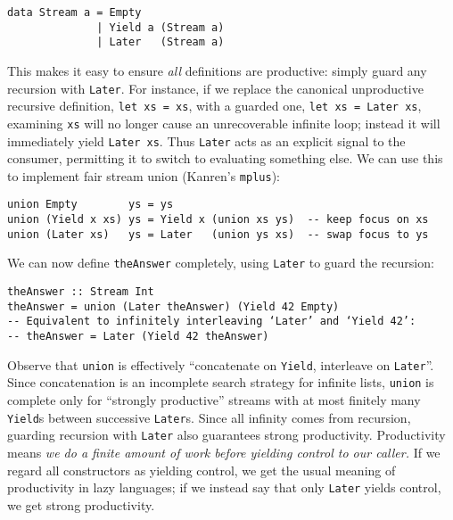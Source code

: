 \documentclass[acmsmall,screen,review,anonymous,dvipsnames,svgnames]{acmart}
\newcommand\hask[1]{\texttt{#1}}
\newcommand\ttt\texttt
\begin{document}

\begin{verbatim}
data Stream a = Empty
              | Yield a (Stream a)
              | Later   (Stream a)
\end{verbatim}

\noindent
This makes it easy to ensure \emph{all} definitions are productive: simply guard any recursion with \hask{Later}.\footnotemark{}
For instance, if we replace the canonical unproductive recursive definition, \hask{let xs = xs}, with a guarded one, \hask{let xs = Later xs}, examining \ttt{xs} will no longer cause an unrecoverable infinite loop; instead it will immediately yield \hask{Later xs}.
Thus \hask{Later} acts as an explicit signal to the consumer, permitting it to switch to evaluating something else.
We can use this to implement fair stream union (\textmu{}Kanren's \ttt{mplus}):


\begin{verbatim}
union Empty        ys = ys
union (Yield x xs) ys = Yield x (union xs ys)  -- keep focus on xs
union (Later xs)   ys = Later   (union ys xs)  -- swap focus to ys
\end{verbatim}

\noindent
We can now define \ttt{theAnswer} completely, using \hask{Later} to guard the recursion:

\begin{verbatim}
theAnswer :: Stream Int
theAnswer = union (Later theAnswer) (Yield 42 Empty)
-- Equivalent to infinitely interleaving ‘Later’ and ‘Yield 42’:
-- theAnswer = Later (Yield 42 theAnswer)
\end{verbatim}

\noindent
Observe that \ttt{union} is effectively ``concatenate on \hask{Yield}, interleave on \hask{Later}''.
Since concatenation is an incomplete search strategy for infinite lists, \ttt{union} is complete only for {``strongly productive''} streams with at most finitely many \hask{Yield}s between successive \hask{Later}s.
Since all infinity comes from recursion, guarding recursion with \hask{Later} also guarantees strong productivity.
%
Productivity means \emph{we do a finite amount of work before yielding control to our caller.}
If we regard all constructors as yielding control, we get the usual meaning of productivity in lazy languages;
if we instead say that only \hask{Later} yields control, we get strong productivity.\footnotemark
\end{document}
